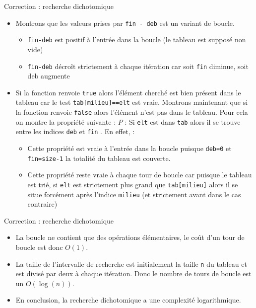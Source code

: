 \documentclass[10pt]{beamer}
\begin{document}
\begin{frame}[fragile]{\Ctitle}{\stitle}
    \begin{exampleblock}{Correction : recherche dichotomique}
        \begin{itemize}
            \item<2->\textcolor{OliveGreen}{Montrons que les valeurs prises par {\tt fin - deb} est un variant de boucle.
            \begin{itemize}
                \item\textcolor{OliveGreen}{{\tt fin-deb} est positif à l'entrée dans la boucle (le tableau est supposé non vide)}
                \item\textcolor{OliveGreen}{{\tt fin-deb} décroît strictement à chaque itération car soit {\tt fin} diminue, soit {\tt }deb augmente}
            \end{itemize}
            }
            \item<3->\textcolor{OliveGreen}{Si la fonction renvoie {\tt true} alors l'élément cherché est bien présent dans le tableau car le test {\tt tab[milieu]==elt} est vraie. Montrons maintenant que si la fonction renvoie {\tt false} alors l'élément n'est pas dans le tableau. Pour cela on montre la propriété suivante : $P$ : \og{} Si {\tt elt} est dans {\tt tab} alors il se trouve entre les indices {\tt deb} et {\tt fin} \fg{}. En effet, :
            \begin{itemize}
                \item<4->\textcolor{OliveGreen}{Cette propriété est vraie à l'entrée dans la boucle puisque {\tt deb=0} et {\tt fin=size-1} la totalité du tableau est couverte.}
                \item<5->\textcolor{OliveGreen}{Cette propriété reste vraie à chaque tour de boucle car puisque le tableau est trié, si {\tt elt} est strictement plus grand que {\tt tab[milieu]} alors il se situe forcément après l'indice {\tt milieu} (et strictement avant dans le cas contraire)}
            \end{itemize}}
        \end{itemize}
    \end{exampleblock}
\end{frame}

\begin{frame}[fragile]{\Ctitle}{\stitle}
    \begin{exampleblock}{Correction : recherche dichotomique}
        \begin{itemize}
        \item<1->\textcolor{OliveGreen}{La boucle ne contient que des opérations élémentaires, le coût d'un tour de boucle est donc $O(1)$.}
        \item<2->\textcolor{OliveGreen}{La taille de l'intervalle de recherche est initialement la taille {\tt n} du tableau et est divisé par deux à chaque itération. Donc le nombre de tours de boucle est un $O(\log(n))$.}
        \item<3->\textcolor{OliveGreen}{En conclusion, la recherche dichotomique a une complexité logarithmique.}
        \end{itemize}
    \end{exampleblock}
\end{frame}
\end{document}
